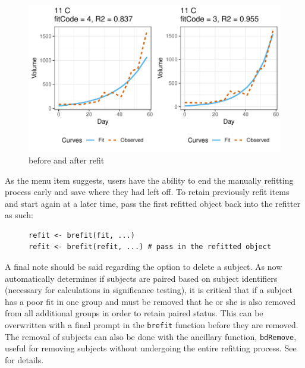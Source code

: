 \begin{figure}[H]
\centering
\includegraphics{img/mouse_refit_plot.pdf}
\caption{before and after refit}
\label{fig:refit_plot}
\end{figure}

As the menu item suggests, users have the ability to end the manually refitting process early and save where they had left off. To retain previously refit items and start again at a later time, pass the first refitted object back into the refitter as such:

\begin{singlespace}
\begin{figure}[H]
\centering
\begin{BVerbatim}
refit <- brefit(fit, ...)
refit <- brefit(refit, ...) # pass in the refitted object
\end{BVerbatim}
\end{figure}
\end{singlespace}



A final note should be said regarding the option to delete a subject. As  now automatically determines if subjects are paired based on subject identifiers (necessary for  calculations in significance testing), it is critical that if a subject has a poor fit in one group and must be removed that he or she is also removed from all additional groups in order to retain paired status. This can be overwritten with a final prompt in the \texttt{brefit} function before they are removed. The removal of subjects can also be done with the ancillary function, \texttt{bdRemove}, useful for removing subjects without undergoing the entire refitting process. See  for details.



